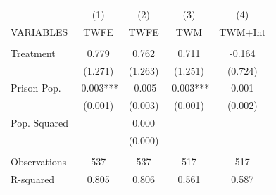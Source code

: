 \begin{tabular}{lcccc} \hline
 & (1) & (2) & (3) & (4) \\
VARIABLES & TWFE & TWFE & TWM & TWM+Int \\ \hline
 &  &  &  &  \\
Treatment & 0.779 & 0.762 & 0.711 & -0.164 \\
 & (1.271) & (1.263) & (1.251) & (0.724) \\
Prison Pop. & -0.003*** & -0.005 & -0.003*** & 0.001 \\
 & (0.001) & (0.003) & (0.001) & (0.002) \\
Pop. Squared &  & 0.000 &  &  \\
 &  & (0.000) &  &  \\
 &  &  &  &  \\
Observations & 537 & 537 & 517 & 517 \\
 R-squared & 0.805 & 0.806 & 0.561 & 0.587 \\ \hline
\end{tabular}
